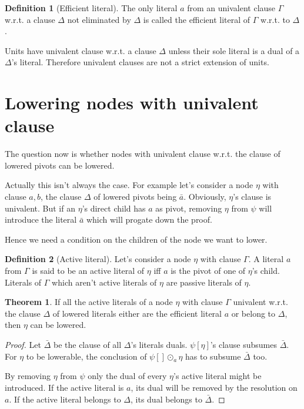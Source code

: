 \documentclass[a4paper]{article}
\theoremstyle{definition}
\newtheorem{thm}{Theorem}
\newtheorem{defn}{Definition}
\begin{document}
\begin{defn}[Efficient literal]
The only literal $a$ from an univalent clause $\Gamma$ w.r.t. a clause $\Delta$
not eliminated by $\Delta$ is called the efficient literal of $\Gamma$
w.r.t. to $\Delta$.
\end{defn}

Units have univalent clause w.r.t. a clause $\Delta$ unless their sole literal
is a dual of a $\Delta$'s literal. Therefore univalent clauses are not a
strict extension of units.


\section{Lowering nodes with univalent clause}

The question now is whether nodes with univalent clause w.r.t. the clause of
lowered pivots can be lowered.

Actually this isn't always the case. For example let's consider a node
$\eta$ with clause $a,b$, the clause $\Delta$ of lowered pivots being
$\bar{a}$. Obviously, $\eta$'s clause is univalent. But if an $\eta$'s
direct child has $a$ as pivot, removing $\eta$ from $\psi$ will introduce
the literal $\bar{a}$ which will progate down the proof.

Hence we need a condition on the children of the node we want to lower.

\begin{defn}[Active literal]
Let's consider a node $\eta$ with clause $\Gamma$. A literal $a$ from
$\Gamma$ is said to be an active literal of $\eta$ iff $a$ is the pivot of
one of $\eta$'s child. Literals of $\Gamma$ which aren't active literals of
$\eta$ are passive literals of $\eta$.
\end{defn}

\begin{thm}
If all the active literals of a node $\eta$ with clause $\Gamma$ univalent
w.r.t. the clause $\Delta$ of lowered literals either are the efficient
literal $a$ or belong to $\Delta$, then $\eta$ can be lowered.
\end{thm}

\begin{proof}
Let $\bar{\Delta}$ be the clause of all $\Delta$'s literals duals.
$\psi[\eta]$'s clause subsumes $\bar{\Delta}$. For $\eta$ to be lowerable,
the conclusion of $\psi[] \odot_a \eta$ has to subsume $\bar{\Delta}$ too.

By removing $\eta$ from $\psi$ only the dual of every $\eta$'s active literal
might be introduced. If the active literal is $a$, its dual will be removed
by the resolution on $a$. If the active literal belongs to $\Delta$, its
dual belongs to $\bar{\Delta}$.
\end{proof}
\end{document}
